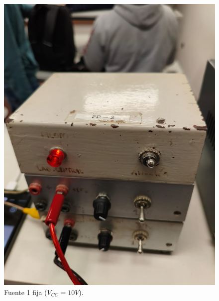 \documentclass[chaptersright]{informeutn}
\begin{document}
\begin{figure}[H]
\begin{minipage}{0.40\textwidth}
          \includegraphics[width=\textwidth]{pictures/fuente1.jpeg}
          \caption{Fuente 1 fija ($V_{CC}=10V$).}
          \label{fig:fuente1}
        \end{minipage}
        \vspace{0.5cm} %
        \begin{minipage}{0.40\textwidth}
          \centering

\end{minipage}
\end{figure}
\end{document}
